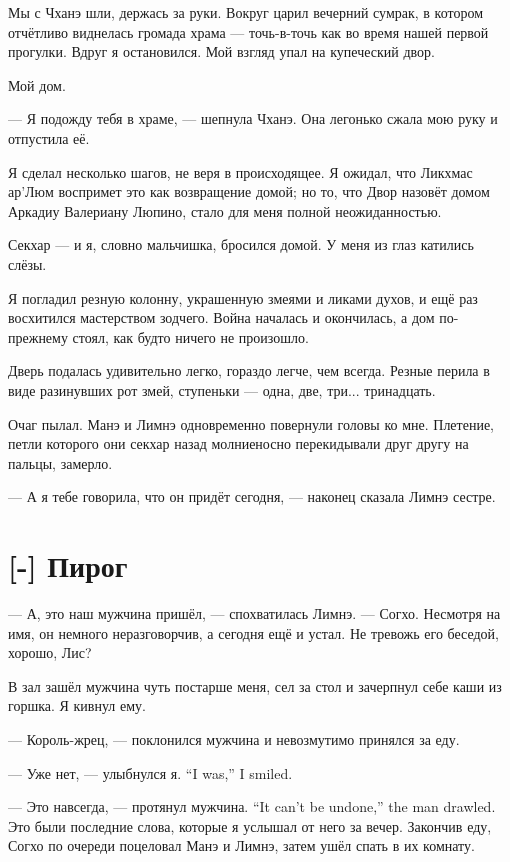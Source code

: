 \textspace

Мы с Чханэ шли, держась за руки.
Вокруг царил вечерний сумрак, в котором отчётливо виднелась громада храма --- точь-в-точь как во время нашей первой прогулки.
Вдруг я остановился.
Мой взгляд упал на купеческий двор.

Мой дом.

--- Я подожду тебя в храме, --- шепнула Чханэ.
Она легонько сжала мою руку и отпустила её.

Я сделал несколько шагов, не веря в происходящее.
Я ожидал, что Ликхмас ар'Люм воспримет это как возвращение домой;
но то, что Двор назовёт домом Аркадиу Валериану Люпино, стало для меня полной неожиданностью.

Секхар --- и я, словно мальчишка, бросился домой.
У меня из глаз катились слёзы.

Я погладил резную колонну, украшенную змеями и ликами духов, и ещё раз восхитился мастерством зодчего.
Война началась и окончилась, а дом по-прежнему стоял, как будто ничего не произошло.

Дверь подалась удивительно легко, гораздо легче, чем всегда.
Резные перила в виде разинувших рот змей, ступеньки --- одна, две, три... тринадцать.

Очаг пылал.
Манэ и Лимнэ одновременно повернули головы ко мне.
Плетение, петли которого они секхар назад молниеносно перекидывали друг другу на пальцы, замерло.

--- А я тебе говорила, что он придёт сегодня, --- наконец сказала Лимнэ сестре.

\section{[-] Пирог}

\textspace

--- А, это наш мужчина пришёл, --- спохватилась Лимнэ.
--- Согхо.
Несмотря на имя, он немного неразговорчив, а сегодня ещё и устал.
Не тревожь его беседой, хорошо, Лис?

В зал зашёл мужчина чуть постарше меня, сел за стол и зачерпнул себе каши из горшка.
Я кивнул ему.

--- Король-жрец, --- поклонился мужчина и невозмутимо принялся за еду.

{--- Уже нет, --- улыбнулся я.}
{``I was,'' I smiled.}

{--- Это навсегда, --- протянул мужчина.}
{``It can't be undone,'' the man drawled.}
Это были последние слова, которые я услышал от него за вечер.
Закончив еду, Согхо по очереди поцеловал Манэ и Лимнэ, затем ушёл спать в их комнату.


